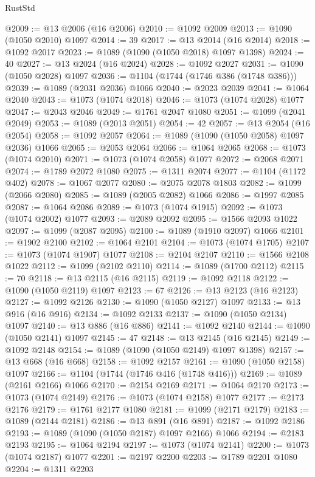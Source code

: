 \begin{lexlean}{RustStd}
\begin{coremodule}
@2009 := @13 @2006 (@16 @2006)
@2010 := @1092 @2009
@2013 := @1090 (@1050 @2010) @1097
@2014 := 39
@2017 := @13 @2014 (@16 @2014)
@2018 := @1092 @2017
@2023 := @1089 (@1090 (@1050 @2018) @1097 @1398)
@2024 := 40
@2027 := @13 @2024 (@16 @2024)
@2028 := @1092 @2027
@2031 := @1090 (@1050 @2028) @1097
@2036 := @1104 (@1744 (@1746 @386 (@1748 @386)))
@2039 := @1089 (@2031 @2036) @1066
@2040 := @2023 @2039
@2041 := @1064 @2040
@2043 := @1073 (@1074 @2018)
@2046 := @1073 (@1074 @2028) @1077
@2047 := @2043 @2046
@2049 := @1761 @2047 @1080
@2051 := @1099 (@2041 @2049)
@2053 := @1089 (@2013 @2051)
@2054 := 42
@2057 := @13 @2054 (@16 @2054)
@2058 := @1092 @2057
@2064 := @1089 (@1090 (@1050 @2058) @1097 @2036) @1066
@2065 := @2053 @2064
@2066 := @1064 @2065
@2068 := @1073 (@1074 @2010)
@2071 := @1073 (@1074 @2058) @1077
@2072 := @2068 @2071
@2074 := @1789 @2072 @1080
@2075 := @1311 @2074
@2077 := @1104 (@1172 @402)
@2078 := @1067 @2077
@2080 := @2075 @2078 @1803
@2082 := @1099 (@2066 @2080)
@2085 := @1089 (@2005 @2082) @1066
@2086 := @1997 @2085
@2087 := @1064 @2086
@2089 := @1073 (@1074 @1915)
@2092 := @1073 (@1074 @2002) @1077
@2093 := @2089 @2092
@2095 := @1566 @2093 @1022
@2097 := @1099 (@2087 @2095)
@2100 := @1089 (@1910 @2097) @1066
@2101 := @1902 @2100
@2102 := @1064 @2101
@2104 := @1073 (@1074 @1705)
@2107 := @1073 (@1074 @1907) @1077
@2108 := @2104 @2107
@2110 := @1566 @2108 @1022
@2112 := @1099 (@2102 @2110)
@2114 := @1089 (@1700 @2112)
@2115 := 70
@2118 := @13 @2115 (@16 @2115)
@2119 := @1092 @2118
@2122 := @1090 (@1050 @2119) @1097
@2123 := 67
@2126 := @13 @2123 (@16 @2123)
@2127 := @1092 @2126
@2130 := @1090 (@1050 @2127) @1097
@2133 := @13 @916 (@16 @916)
@2134 := @1092 @2133
@2137 := @1090 (@1050 @2134) @1097
@2140 := @13 @886 (@16 @886)
@2141 := @1092 @2140
@2144 := @1090 (@1050 @2141) @1097
@2145 := 47
@2148 := @13 @2145 (@16 @2145)
@2149 := @1092 @2148
@2154 := @1089 (@1090 (@1050 @2149) @1097 @1398)
@2157 := @13 @668 (@16 @668)
@2158 := @1092 @2157
@2161 := @1090 (@1050 @2158) @1097
@2166 := @1104 (@1744 (@1746 @416 (@1748 @416)))
@2169 := @1089 (@2161 @2166) @1066
@2170 := @2154 @2169
@2171 := @1064 @2170
@2173 := @1073 (@1074 @2149)
@2176 := @1073 (@1074 @2158) @1077
@2177 := @2173 @2176
@2179 := @1761 @2177 @1080
@2181 := @1099 (@2171 @2179)
@2183 := @1089 (@2144 @2181)
@2186 := @13 @891 (@16 @891)
@2187 := @1092 @2186
@2193 := @1089 (@1090 (@1050 @2187) @1097 @2166) @1066
@2194 := @2183 @2193
@2195 := @1064 @2194
@2197 := @1073 (@1074 @2141)
@2200 := @1073 (@1074 @2187) @1077
@2201 := @2197 @2200
@2203 := @1789 @2201 @1080
@2204 := @1311 @2203

\end{coremodule}
\end{lexlean}
